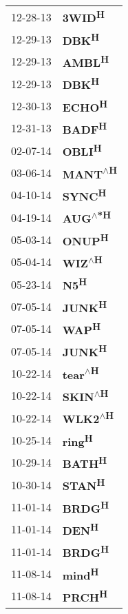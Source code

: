 \begin{supertabular}{p{0.08\textwidth}p{0.2\textwidth}}
 12-28-13 &           \textbf{3WID\textsuperscript{H}} \\
 12-29-13 &            \textbf{DBK\textsuperscript{H}} \\
 12-29-13 &           \textbf{AMBL\textsuperscript{H}} \\
 12-29-13 &            \textbf{DBK\textsuperscript{H}} \\
 12-30-13 &           \textbf{ECHO\textsuperscript{H}} \\
 12-31-13 &           \textbf{BADF\textsuperscript{H}} \\
 02-07-14 &           \textbf{OBLI\textsuperscript{H}} \\
 03-06-14 &   \textbf{MANT\textsuperscript{$\wedge$H}} \\
 04-10-14 &           \textbf{SYNC\textsuperscript{H}} \\
 04-19-14 &   \textbf{AUG\textsuperscript{$\wedge$*H}} \\
 05-03-14 &           \textbf{ONUP\textsuperscript{H}} \\
 05-04-14 &    \textbf{WIZ\textsuperscript{$\wedge$H}} \\
 05-23-14 &             \textbf{N5\textsuperscript{H}} \\
 07-05-14 &           \textbf{JUNK\textsuperscript{H}} \\
 07-05-14 &            \textbf{WAP\textsuperscript{H}} \\
 07-05-14 &           \textbf{JUNK\textsuperscript{H}} \\
 10-22-14 &   \textbf{tear\textsuperscript{$\wedge$H}} \\
 10-22-14 &   \textbf{SKIN\textsuperscript{$\wedge$H}} \\
 10-22-14 &   \textbf{WLK2\textsuperscript{$\wedge$H}} \\
 10-25-14 &           \textbf{ring\textsuperscript{H}} \\
 10-29-14 &           \textbf{BATH\textsuperscript{H}} \\
 10-30-14 &           \textbf{STAN\textsuperscript{H}} \\
 11-01-14 &           \textbf{BRDG\textsuperscript{H}} \\
 11-01-14 &            \textbf{DEN\textsuperscript{H}} \\
 11-01-14 &           \textbf{BRDG\textsuperscript{H}} \\
 11-08-14 &           \textbf{mind\textsuperscript{H}} \\
 11-08-14 &           \textbf{PRCH\textsuperscript{H}} \\

\end{supertabular}
